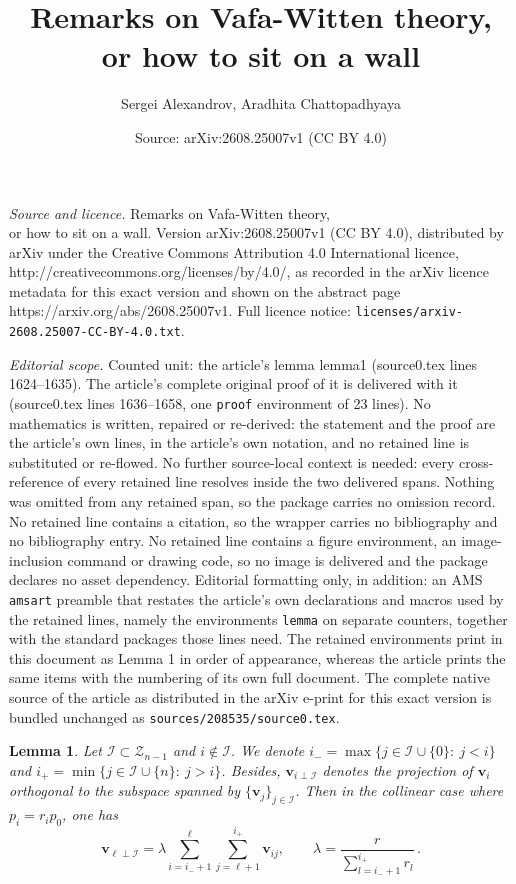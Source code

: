 \documentclass[10pt,a4paper]{amsart}
\title{Remarks on Vafa-Witten theory, \\ or how to sit on a wall}
\author{Sergei Alexandrov, Aradhita Chattopadhyaya}
\date{Source: arXiv:2608.25007v1 (CC BY 4.0)}
\newtheorem{lemma}{Lemma}
\def\Zv{\mathscr{Z}}
\def\be{\begin{equation}}
\newcommand{\bfv}{{\boldsymbol v}}
\newcommand{\cI}{\mathcal{I}}
\def\ee{\end{equation}}
\begin{document}
\maketitle

\noindent\emph{Source and licence.} Remarks on Vafa-Witten theory, \\ or how to sit on a wall. Version arXiv:2608.25007v1 (CC BY 4.0), distributed by arXiv under the Creative Commons Attribution 4.0 International licence, http://creativecommons.org/licenses/by/4.0/, as recorded in the arXiv licence metadata for this exact version and shown on the abstract page https://arxiv.org/abs/2608.25007v1. Full licence notice: \texttt{licenses/arxiv-2608.25007-CC-BY-4.0.txt}.\par\smallskip

\noindent\textit{Editorial scope.} Counted unit: the article's lemma lemma1 (source0.tex lines 1624--1635). The article's complete original proof of it is delivered with it (source0.tex lines 1636--1658, one \texttt{proof} environment of 23 lines). No mathematics is written, repaired or re-derived: the statement and the proof are the article's own lines, in the article's own notation, and no retained line is substituted or re-flowed.  No further source-local context is needed: every cross-reference of every retained line resolves inside the two delivered spans.  Nothing was omitted from any retained span, so the package carries no omission record.  No retained line contains a citation, so the wrapper carries no bibliography and no bibliography entry.  No retained line contains a figure environment, an image-inclusion command or drawing code, so no image is delivered and the package declares no asset dependency.  Editorial formatting only, in addition: an AMS \texttt{amsart} preamble that restates the article's own declarations and macros used by the retained lines, namely the environments \texttt{lemma} on separate counters, together with the standard packages those lines need.  The retained environments print in this document as Lemma 1 in order of appearance, whereas the article prints the same items with the numbering of its own full document.  The complete native source of the article as distributed in the arXiv e-print for this exact version is bundled unchanged as \texttt{sources/208535/source0.tex}.
\begin{lemma}
	\label{lemma1}
	Let $\cI\subset \Zv_{n-1}$ and $i\notin \cI$. We denote $i_-=\max\{j\in \cI\cup\{0\}:\ j<i\}$
	and $i_+=\min\{j\in \cI\cup\{n\}:\ j>i\}$. Besides, $\bfv_{i\perp \cI}$ denotes the projection of $\bfv_i$ 
	orthogonal to the subspace spanned by $\{\bfv_j\}_{j\in\cI}$.	
	Then in the collinear case where $p_i=r_ip_0$, one has 
	\be
	\bfv_{\ell\perp \cI}=\lambda \sum_{i=i_-+1}^\ell\sum_{j=\ell+1}^{i_+}\bfv_{ij},
	\qquad 
	\lambda=\frac{r}{\sum_{l=i_-+1}^{i_+}r_l}\, .
	\ee
\end{lemma}
\end{document}
